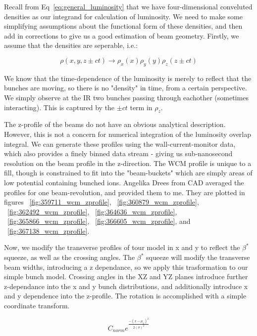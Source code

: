 Recall from Eq~\ref{eq:general_luminosity} that we have four-dimensional
conveluted densities as our integrand for calculation of luminosity. We need to
make some simplifying assumptions about the functional form of these densities,
and then add in corrections to give us a good estimation of beam geometry.
Firstly, we assume that the densities are seperable, i.e.: 

\begin{equation}
  \label{eq:sep_density}
  \rho(x,y,z\pm ct) \rightarrow \rho_{x}(x)\rho_{y}(y)\rho_{z}(z\pm ct)
\end{equation}

We know that the time-dependence of the luminosity is merely to reflect that the
bunches are moving, so there is no "density" in time, from a certain
perspective. We simply observe at the IR two bunches passing through eachother
(sometimes interacting).  This is captured by the $\pm ct$ term in $\rho_{z}$. 

The z-profile of the beams do not have an obvious analytical description.
However, this is not a concern for numerical integration of the luminosity
overlap integral. We can generate these profiles using the wall-current-monitor
data, which also provides a finely binned data stream - giving us sub-nanosecond
resolution on the beam profile in the z-direction. The WCM profile is unique to
a fill, though is constrained to fit into the "beam-buckets" which are simply
areas of low potential containing bunched ions. Angelika Drees from CAD
averaged the profiles for one beam-revolution, and provided them to me. They
are plotted in figures ~\ref{fig:359711_wcm_zprofile},
~\ref{fig:360879_wcm_zprofile}, ~\ref{fig:362492_wcm_zprofile},
~\ref{fig:364636_wcm_zprofile}, ~\ref{fig:365866_wcm_zprofile},
~\ref{fig:366605_wcm_zprofile}, and ~\ref{fig:367138_wcm_zprofile}.

Now, we modify the transverse profiles of tour model in x and y to reflect the
$\beta^{*}$ squeeze, as well as the crossing angles. The $\beta^{*}$ squeeze
will modify the transverse beam widths, introducing a z dependance, so we apply
this trasformation to our simple bunch model. Crossing angles in the XZ and YZ
planes introduce further z-dependance into the x and y bunch distributions, and
additionally introduce x and y dependence into the z-profile. The rotation is
accomplished with a simple coordinate transform.

\begin{equation}
  \label{eq:realistic_transverse_density}
  C_{norm}{e}^{\frac{-{\left(x-\mu_{x}\right)}^2}{2{\left(\sigma\right)}^2}}
\end{equation}

